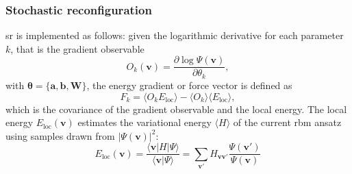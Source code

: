 \documentclass[10pt,a4paper]{article}
\numberwithin{equation}{section}
\begin{document}
\subsubsection{Stochastic reconfiguration}
\gls{sr} is implemented as follows: given the logarithmic derivative for each parameter $k$, that is the gradient observable
\begin{equation}
    O_k(\mathbf{v}) = \frac{\partial \log \Psi(\mathbf{v})}{\partial \theta_k},
\end{equation}
with $\boldsymbol{\theta} = \{\mathbf{a}, \mathbf{b}, \mathbf{W}\}$, the energy gradient or force vector is defined as
\begin{equation}
    F_k = \langle O_k E_\text{loc} \rangle - \langle O_k \rangle \langle E_\text{loc} \rangle,
\end{equation}
which is the covariance of the gradient observable and the local energy. The local energy $E_\text{loc}(\mathbf{v})$ estimates the variational energy $\langle H \rangle$ of the current \gls{rbm} ansatz using samples drawn from $|\Psi(\mathbf{v})|^2$\cite{Carleo_2017}:
\begin{equation}
\label{eq:localenergy}
  E_\text{loc}(\mathbf{v}) = \frac{\langle \mathbf{v} | H | \Psi \rangle}{\langle
  \mathbf{v} | \Psi \rangle} = \sum_{\mathbf{v}'} H_{\mathbf{v}\mathbf{v}'}
  \frac{\Psi(\mathbf{v}')}{\Psi(\mathbf{v})}
\end{equation}
\end{document}
